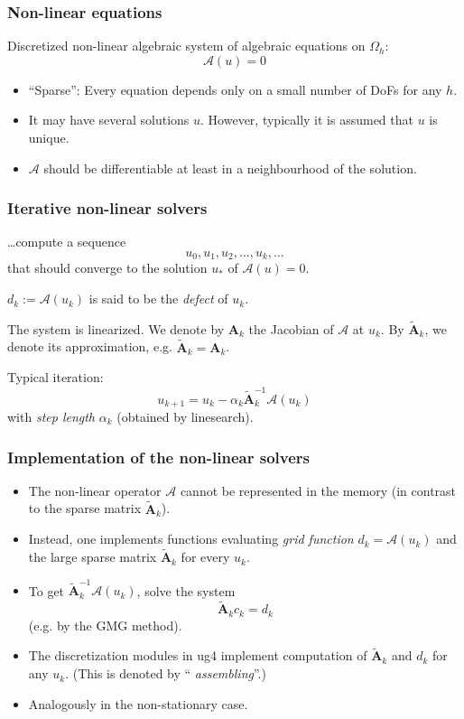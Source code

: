 \begin{frame} [t]
\frametitle {Non-linear equations}
Discretized non-linear algebraic system of algebraic equations on $\Omega_h$:
$$
 \mathcal{A} (u) = 0
$$
\begin{itemize}
 \pause
 \item ``Sparse'': Every equation depends only on a small number of DoFs for any $h$.
 \pause
 \item It may have several solutions $u$. However, typically it is assumed that $u$ is unique.
 \pause
 \item $\mathcal{A}$ should be differentiable at least in a neighbourhood of the solution.
\end{itemize}
\end{frame}

\begin{frame} [t]
\frametitle {Iterative non-linear solvers}
\dots compute a sequence
$$
 u_0, u_1, u_2, \dots, u_k, \dots
$$
that should converge to the solution $u_{*}$ of $\mathcal{A} (u) = 0$.

\pause
\vspace{2ex}
$d_k := \mathcal{A} (u_k)$ is said to be the \emph{defect} of $u_k$.

\pause
\vspace{2ex}
The system is linearized. We denote by $\mathbf{A}_k$ the Jacobian of
$\mathcal{A}$ at $u_k$. By $\tilde{\mathbf{A}}_k$, we denote its approximation, e.g.
$\tilde{\mathbf{A}}_k = \mathbf{A}_k$.

\pause
\vspace{2ex}
Typical iteration:
$$
 u_{k+1} = u_k - \alpha_k \tilde{\mathbf{A}}_k^{-1} \mathcal{A} (u_k)
$$
with \emph{step length} $\alpha_k$ (obtained by linesearch).
\end{frame}

\begin{frame} [t]
\frametitle {Implementation of the non-linear solvers}
\begin{itemize}
 \item The non-linear operator $\mathcal{A}$ cannot be represented in the memory
  (in contrast to the sparse matrix $\tilde{\mathbf{A}}_k$).
 \pause
 \item Instead, one implements functions evaluating \emph{grid function} $d_k = \mathcal{A} (u_k)$
  and the large sparse matrix $\tilde{\mathbf{A}}_k$ for every $u_k$.
 \pause
 \item To get $\tilde{\mathbf{A}}_k^{-1} \mathcal{A} (u_k)$, solve the system
  $$
   \tilde{\mathbf{A}}_k c_k = d_k
  $$
  (e.g. by the GMG method).
 \pause
 \item The discretization modules in ug4 implement computation of $\tilde{\mathbf{A}}_k$
  and $d_k$ for any $u_k$. (This is denoted by ``{\color{blue} \emph{assembling}}''.) 
 \pause
 \item Analogously in the non-stationary case.
\end{itemize}
\end{frame}

